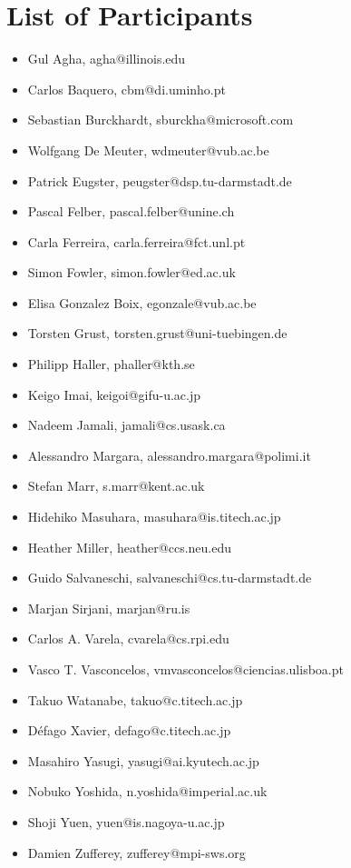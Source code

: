 \documentclass[a4paper]{article}
\begin{document}
\section*{List of Participants}
\begin{itemize}
\item Gul Agha, agha@illinois.edu
\item Carlos Baquero, cbm@di.uminho.pt
\item Sebastian Burckhardt, sburckha@microsoft.com
\item Wolfgang De Meuter, wdmeuter@vub.ac.be
\item Patrick Eugster, peugster@dsp.tu-darmstadt.de
\item Pascal Felber, pascal.felber@unine.ch
\item Carla Ferreira, carla.ferreira@fct.unl.pt
\item Simon Fowler, simon.fowler@ed.ac.uk
\item Elisa Gonzalez Boix, egonzale@vub.ac.be
\item Torsten Grust, torsten.grust@uni-tuebingen.de
\item Philipp Haller, phaller@kth.se
\item Keigo Imai, keigoi@gifu-u.ac.jp
\item Nadeem Jamali, jamali@cs.usask.ca
\item Alessandro Margara, alessandro.margara@polimi.it 
\item Stefan Marr, s.marr@kent.ac.uk
\item Hidehiko Masuhara, masuhara@is.titech.ac.jp
\item Heather Miller, heather@ccs.neu.edu
\item Guido Salvaneschi, salvaneschi@cs.tu-darmstadt.de
\item Marjan Sirjani, marjan@ru.is
\item Carlos A. Varela, cvarela@cs.rpi.edu
\item Vasco T. Vasconcelos, vmvasconcelos@ciencias.ulisboa.pt
\item Takuo Watanabe, takuo@c.titech.ac.jp
\item D\'{e}fago Xavier, defago@c.titech.ac.jp
\item Masahiro Yasugi, yasugi@ai.kyutech.ac.jp
\item Nobuko Yoshida, n.yoshida@imperial.ac.uk
\item Shoji Yuen, yuen@is.nagoya-u.ac.jp
\item Damien Zufferey, zufferey@mpi-sws.org
\end{itemize}
\end{document}
